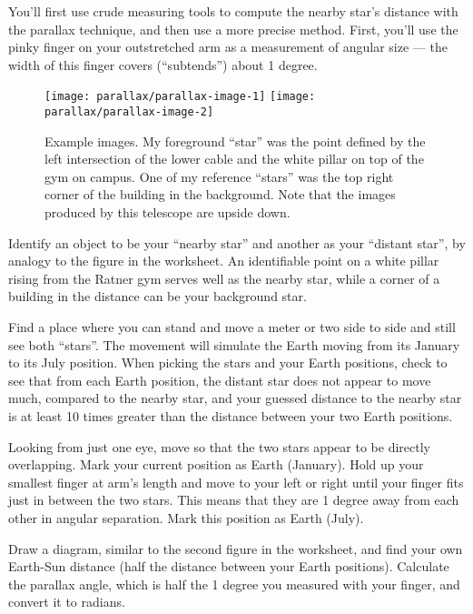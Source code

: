 You'll first use crude measuring tools to compute the nearby star's distance with the parallax technique, and then use a more precise method. First, you'll use the pinky finger on your outstretched arm as a measurement of angular size --- the width of this finger covers (``subtends'') about 1 degree.

\begin{figure}
	\texttt{[image: parallax/parallax-image-1]}
	\texttt{[image: parallax/parallax-image-2]}
	\caption{Example images. My foreground ``star'' was the point defined by the left intersection of the lower cable and the white pillar on top of the gym on campus. One of my reference ``stars'' was the top right corner of the building in the background. Note that the images produced by this telescope are upside down.}\label{par:fig:images}
\end{figure}

\begin{steps}
	\item Identify an object to be your ``nearby star'' and another as your ``distant star'', by analogy to the figure in the worksheet. An identifiable point on a white pillar rising from the Ratner gym serves well as the nearby star, while a corner of a building in the distance can be your background star.
	
	\item Find a place where you can stand and move a meter or two side to side and still see both ``stars''. The movement will simulate the Earth moving from its January to its July position. When picking the stars and your Earth positions, check to see that from each Earth position, the distant star does not appear to move much, compared to the nearby star, and your guessed distance to the nearby star is at least 10 times greater than the distance between your two Earth positions.
	
	\item Looking from just one eye, move so that the two stars appear to be directly overlapping. Mark your current position as Earth (January). Hold up your smallest finger at arm's length and move to your left or right until your finger fits just in between the two stars. This means that they are 1 degree away from each other in angular separation. Mark this position as Earth (July).
	
	\item Draw a diagram, similar to the second figure in the worksheet, and find your own Earth-Sun distance (half the distance between your Earth positions). Calculate the parallax angle, which is half the 1 degree you measured with your finger, and convert it to radians.
\end{steps}
	
